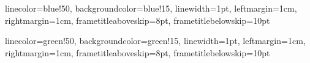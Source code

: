 %
%






{
	linecolor=blue!50,
	backgroundcolor=blue!15,
	linewidth=1pt,
	leftmargin=1cm,
	rightmargin=1cm,
	frametitleaboveskip=8pt,
	frametitlebelowskip=10pt
}

\newcommand{\definition}[2]
{
\begin{mdframed}
[
	style=definitionstyle,
	frametitle={\Large \begin{center}#1\end{center}}
]
#2
\end{mdframed}
}

{
	linecolor=green!50,
	backgroundcolor=green!15,
	linewidth=1pt,
	leftmargin=1cm,
	rightmargin=1cm,
	frametitleaboveskip=8pt,
	frametitlebelowskip=10pt
}

\newcommand{\concept}[2]
{
\begin{mdframed}
[
	style=conceptstyle,
	frametitle={\Large \begin{center}#1\end{center}}
]
#2
\end{mdframed}
}

